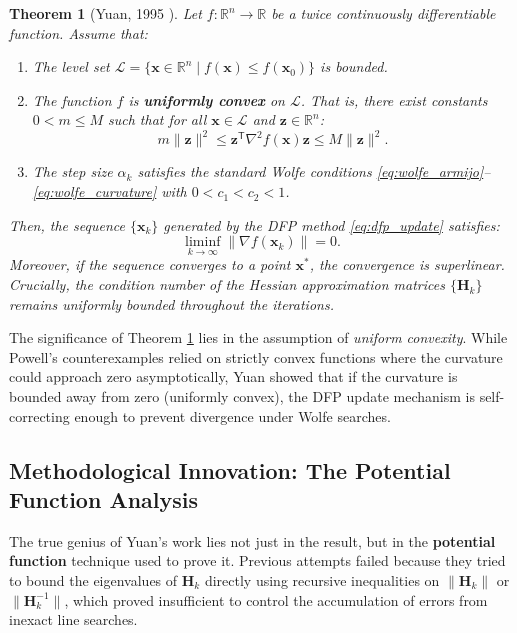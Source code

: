 \documentclass[12pt,a4paper]{article}  %
\newcounter{cite}
\newtheorem{theorem}{Theorem}[section]
\theoremstyle{definition}
\numberwithin{equation}{section}
\newcommand{\RR}{\mathbb{R}}
\newcommand{\HH}{\bm{H}}
\newcommand{\zz}{\bm{z}}
\newcommand{\trans}{{\scriptstyle{\mathsf{T}}}}
\newcommand{\xx}{\mathbf{x}}
\begin{document}
\begin{theorem}[Yuan, 1995 \cite{yuan1995}]
    \label{thm:yuan_main}
    Let $f: \RR^n \to \RR$ be a twice continuously differentiable function. Assume that:
    \begin{enumerate}
        \item[(A1)] The level set $\mathcal{L} = \{ \xx \in \RR^n \mid f(\xx) \le f(\xx_0) \}$ is bounded.
        \item[(A2)] The function $f$ is \textbf{uniformly convex} on $\mathcal{L}$. That is, there exist constants $0 < m \le M$ such that for all $\xx \in \mathcal{L}$ and $\zz \in \RR^n$:
        \begin{equation}
            m \|\zz\|^2 \le \zz^\trans \nabla^2 f(\xx) \zz \le M \|\zz\|^2.
        \end{equation}
        \item[(A3)] The step size $\alpha_k$ satisfies the standard Wolfe conditions \eqref{eq:wolfe_armijo}--\eqref{eq:wolfe_curvature} with $0 < c_1 < c_2 < 1$.
    \end{enumerate}
    Then, the sequence $\{\xx_k\}$ generated by the DFP method \eqref{eq:dfp_update} satisfies:
    \begin{equation}
        \liminf_{k \to \infty} \| \nabla f(\xx_k) \| = 0.
    \end{equation}
    Moreover, if the sequence converges to a point $\xx^*$, the convergence is superlinear. Crucially, the condition number of the Hessian approximation matrices $\{\HH_k\}$ remains uniformly bounded throughout the iterations.
\end{theorem}

The significance of Theorem \ref{thm:yuan_main} lies in the assumption of \textit{uniform convexity}. While Powell's counterexamples \cite{powell1984,powell1986} relied on strictly convex functions where the curvature could approach zero asymptotically, Yuan showed that if the curvature is bounded away from zero (uniformly convex), the DFP update mechanism is self-correcting enough to prevent divergence under Wolfe searches.

\subsection{Methodological Innovation: The Potential Function Analysis}
The true genius of Yuan's work \cite{yuan1995} lies not just in the result, but in the \textbf{potential function} technique used to prove it. Previous attempts failed because they tried to bound the eigenvalues of $\HH_k$ directly using recursive inequalities on $\|\HH_k\|$ or $\|\HH_k^{-1}\|$, which proved insufficient to control the accumulation of errors from inexact line searches.
\end{document}
